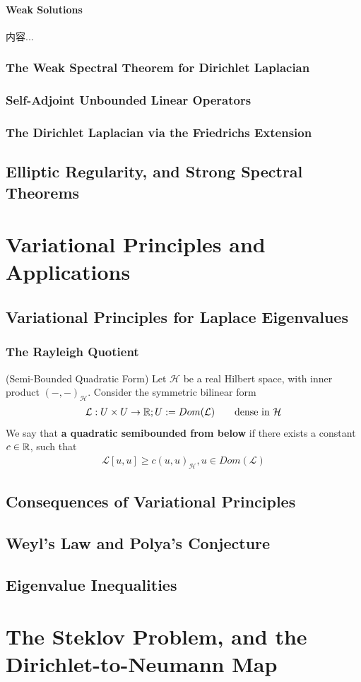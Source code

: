 \documentclass[Total.tex]{subfiles}
\begin{document}
					\subsubsection{Weak Solutions}
					\begin{lemma}
						内容...
					\end{lemma}
				\subsection{The Weak Spectral Theorem for Dirichlet Laplacian}
				\subsection{Self-Adjoint Unbounded Linear Operators}
				\subsection{The Dirichlet Laplacian via the Friedrichs Extension}
				\section{Elliptic Regularity, and Strong Spectral Theorems}
		\chapter{Variational Principles and Applications}
			\section{Variational Principles for Laplace Eigenvalues}
				\subsection{The Rayleigh Quotient}
					\begin{Def}
						(Semi-Bounded Quadratic Form) Let $\mathcal{H}$ be a real Hilbert space, with inner product $(-,-)_\mathcal{H}$. Consider the symmetric bilinear form
						\begin{gather*}
							\mathcal{L}:U\times U\rightarrow \mathbb{R};U:=Dom(\mathcal{L})\qquad\mbox{dense in }\mathcal{H}
						\end{gather*} We say that \textbf{a quadratic semibounded from below} if there exists a constant $c\in \mathbb{R}$, such that
						\begin{gather*}
							\mathcal{L}[u,u]\geq c(u,u)_\mathcal{H},u\in Dom(\mathcal{L})
						\end{gather*}
					\end{Def}
			\section{Consequences of Variational Principles}
			\section{Weyl's Law and Polya's Conjecture}
			\section{Eigenvalue Inequalities}
		\chapter{The Steklov Problem, and the Dirichlet-to-Neumann Map}
		 
\end{document}
